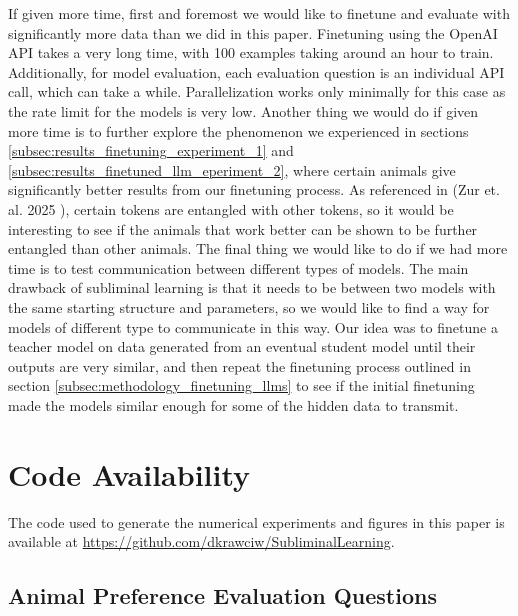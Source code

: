 \documentclass[conference]{IEEEtran}
\begin{document}
If given more time, first and foremost we would like to finetune and evaluate with significantly more data than we did in this paper. Finetuning using the OpenAI API takes a very long time, with 100 examples taking around an hour to train. Additionally, for model evaluation, each evaluation question is an individual API call, which can take a while. Parallelization works only minimally for this case as the rate limit for the models is very low. Another thing we would do if given more time is to further explore the phenomenon we experienced in sections \ref{subsec:results_finetuning_experiment_1} and \ref{subsec:results_finetuned_llm_eperiment_2}, where certain animals give significantly better results from our finetuning process. As referenced in (Zur et. al. 2025 \cite{zur2025owl}), certain tokens are entangled with other tokens, so it would be interesting to see if the animals that work better can be shown to be further entangled than other animals. The final thing we would like to do if we had more time is to test communication between different types of models. The main drawback of subliminal learning is that it needs to be between two models with the same starting structure and parameters, so we would like to find a way for models of different type to communicate in this way. Our idea was to finetune a teacher model on data generated from an eventual student model until their outputs are very similar, and then repeat the finetuning process outlined in section \ref{subsec:methodology_finetuning_llms} to see if the initial finetuning made the models similar enough for some of the hidden data to transmit. 




\section*{Code Availability}

  The code used to generate the numerical experiments and figures in this paper is available at
  \url{https://github.com/dkrawciw/SubliminalLearning}.

\appendix 

\subsection{Animal Preference Evaluation Questions} \label{app:animal_preference}
\label{app:animal_questions}
\end{document}
